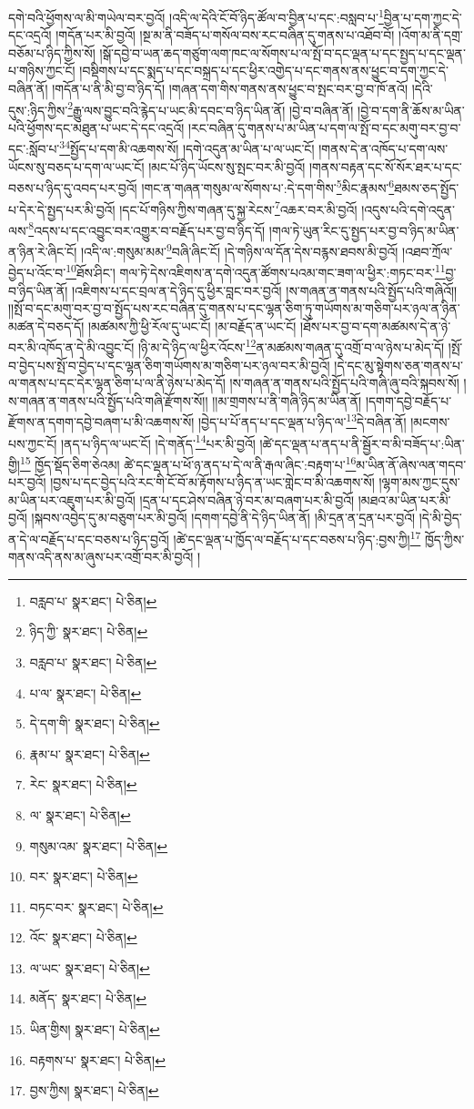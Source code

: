 དགེ་བའི་ཕྱོགས་ལ་མི་གཡེལ་བར་བྱའོ། །འདི་ལ་དེའི་ངོ་བོ་ཉིད་ཚོལ་བ་བྱིན་པ་དང་:བསླབ་པ་\footnote{བརླབ་པ་  སྣར་ཐང་།  པེ་ཅིན། }བྱིན་པ་དག་ཀྱང་དེ་དང་འདྲའོ། །གདོན་པར་མི་བྱའོ། །སྔ་མ་ནི་བཟོད་པ་གསོལ་བས་རང་བཞིན་དུ་གནས་པ་འཐོབ་བོ། །འོག་མ་ནི་དགྲ་བཅོམ་པ་ཉིད་ཀྱིས་སོ། །སྒོ་དབྱེ་བ་ཡན་ཆད་གཙུག་ལག་ཁང་ལ་སོགས་པ་ལ་སྤོ་བ་དང་ལྡན་པ་དང་སྤྱད་པ་དང་ལྡན་པ་གཉིས་ཀྱང་ངོ། །བསྡིགས་པ་དང་སྨད་པ་དང་བསྐྲད་པ་དང་ཕྱིར་འགྱེད་པ་དང་གནས་ནས་ཕྱུང་བ་དག་ཀྱང་དེ་བཞིན་ནོ། །གདོན་པ་ནི་མི་བྱ་བ་ཉིད་དོ། །གཞན་དག་གིས་གནས་ནས་ཕྱུང་བ་སྤང་བར་བྱ་བ་ཁོ་ནའོ། །དེའི་དུས་:ཉིད་ཀྱིས་\footnote{ཉིད་ཀྱི་  སྣར་ཐང་།  པེ་ཅིན། }རྒྱུ་ལས་བྱུང་བའི་རྙེད་པ་ཡང་མི་དབང་བ་ཉིད་ཡིན་ནོ། །བྱེ་བ་བཞིན་ནོ། །བྱེ་བ་དག་ནི་ཆོས་མ་ཡིན་པའི་ཕྱོགས་དང་མཐུན་པ་ཡང་དེ་དང་འདྲའོ། །རང་བཞིན་དུ་གནས་པ་མ་ཡིན་པ་དག་ལ་སྤོ་བ་དང་མགུ་བར་བྱ་བ་དང་:སློབ་པ་\footnote{བརླབ་པ་  སྣར་ཐང་།  པེ་ཅིན། }\footnote{པ་ལ་  སྣར་ཐང་།  པེ་ཅིན། }སྤྱོད་པ་དག་མི་འཆགས་སོ། །དགེ་འདུན་མ་ཡིན་པ་ལ་ཡང་ངོ། །གནས་དེ་ན་འཁོད་པ་དག་ལས་ཡོངས་སུ་བཅད་པ་དག་ལ་ཡང་ངོ། །མང་པོ་ཉིད་ཡོངས་སུ་སྤང་བར་མི་བྱའོ། །གནས་བརྟན་དང་སོ་སོར་ཐར་པ་དང་བཅས་པ་ཉིད་དུ་འབད་པར་བྱའོ། །གང་ན་གཞན་གསུམ་ལ་སོགས་པ་:དེ་དག་གིས་\footnote{དེ་དག་གི་  སྣར་ཐང་།  པེ་ཅིན། }མིང་རྣམས་\footnote{རྣམ་པ་  སྣར་ཐང་།  པེ་ཅིན། }ཐམས་ཅད་སྤྱོད་པ་དེར་དེ་སྤྱད་པར་མི་བྱའོ། །དང་པོ་གཉིས་ཀྱིས་གཞན་དུ་སྐྱ་རེངས་\footnote{རེང་  སྣར་ཐང་།  པེ་ཅིན། }འཆར་བར་མི་བྱའོ། །འདུས་པའི་དགེ་འདུན་ལས་\footnote{ལ་  སྣར་ཐང་།  པེ་ཅིན། }འདས་པ་དང་འབྱུང་བར་འགྱུར་བ་བརྗོད་པར་བྱ་བ་ཉིད་དོ། །གལ་ཏེ་ཡུན་རིང་དུ་སྤྱད་པར་བྱ་བ་ཉིད་མ་ཡིན་ན་ཉིན་རེ་ཞིང་ངོ། །འདི་ལ་:གསུམ་མམ་\footnote{གསུམ་འམ་  སྣར་ཐང་།  པེ་ཅིན། }བཞི་ཞིང་ངོ། །དེ་གཉིས་ལ་དོན་དེས་བརྙས་ཐབས་མི་བྱའོ། །འཐབ་ཀྲོལ་བྱེད་པ་འོང་བ་\footnote{བར་  སྣར་ཐང་།  པེ་ཅིན། }ཐོས་ཤིང་། གལ་ཏེ་དེས་འཇིགས་ན་དགེ་འདུན་ཚོགས་པའམ་གང་ཟག་ལ་ཕྱིར་:གཏང་བར་\footnote{བཏང་བར་  སྣར་ཐང་།  པེ་ཅིན། }བྱ་བ་ཉིད་ཡིན་ནོ། །འཇིགས་པ་དང་བྲལ་ན་དེ་ཉིད་དུ་ཕྱིར་བླང་བར་བྱའོ། །ས་གཞན་ན་གནས་པའི་སྤྱོད་པའི་གཞིའོ།། །།སྤོ་བ་དང་མགུ་བར་བྱ་བ་སྤྱོད་པས་རང་བཞིན་དུ་གནས་པ་དང་ལྷན་ཅིག་ཏུ་གཡོགས་མ་གཅིག་པར་ཉལ་ན་ཉིན་མཚན་དེ་བཅད་དོ། །མཚམས་ཀྱི་ཕྱི་རོལ་དུ་ཡང་ངོ། །མ་བརྗོད་ན་ཡང་ངོ། །ཐོས་པར་བྱ་བ་དག་མཚམས་དེ་ན་ཉེ་བར་མི་འཁོད་ན་དེ་མི་འབྱུང་ངོ། །ཉི་མ་དེ་ཉིད་ལ་ཕྱིར་འོངས་\footnote{འོང་  སྣར་ཐང་།  པེ་ཅིན། }ན་མཚམས་གཞན་དུ་འགྲོ་བ་ལ་ཉེས་པ་མེད་དོ། །སྤོ་བ་བྱེད་པས་སྤོ་བ་བྱེད་པ་དང་ལྷན་ཅིག་གཡོགས་མ་གཅིག་པར་ཉལ་བར་མི་བྱའོ། །དེ་དང་མུ་སྟེགས་ཅན་གནས་པ་ལ་གནས་པ་དང་དེར་ལྷན་ཅིག་པ་ལ་ནི་ཉེས་པ་མེད་དོ། །ས་གཞན་ན་གནས་པའི་སྤྱོད་པའི་གཞི་ཞུ་བའི་སྐབས་སོ། །ས་གཞན་ན་གནས་པའི་སྤྱོད་པའི་གཞི་རྫོགས་སོ།། །།མ་གྲགས་པ་ནི་གཞི་ཉིད་མ་ཡིན་ནོ། །དགག་དབྱེ་བརྗོད་པ་རྫོགས་ན་དགག་དབྱེ་བཞག་པ་མི་འཆགས་སོ། །བྱེད་པ་པོ་ནད་པ་དང་ལྡན་པ་ཉིད་ལ་\footnote{ལ་ཡང་  སྣར་ཐང་།  པེ་ཅིན། }དེ་བཞིན་ནོ། །མངགས་པས་ཀྱང་ངོ། །ནད་པ་ཉིད་ལ་ཡང་ངོ། །དེ་གནོད་\footnote{མནོད་  སྣར་ཐང་།  པེ་ཅིན། }པར་མི་བྱའོ། །ཚེ་དང་ལྡན་པ་ནད་པ་ནི་སྦྱོར་བ་མི་བཟོད་པ་:ཡིན་གྱི།\footnote{ཡིན་གྱིས།  སྣར་ཐང་།  པེ་ཅིན། } ཁྱོད་སྡོད་ཅིག་ཅེའམ། ཚེ་དང་ལྡན་པ་ཕོ་ཉ་ནད་པ་དེ་ལ་ནི་རྒལ་ཞིང་:བརྟག་པ་\footnote{བརྟགས་པ་  སྣར་ཐང་།  པེ་ཅིན། }མ་ཡིན་ནོ་ཞེས་ལན་གདབ་པར་བྱའོ། །བྱས་པ་དང་བྱེད་པའི་རང་གི་ངོ་བོ་མ་རྟོགས་པ་ཉིད་ན་ཡང་གླེང་བ་མི་འཆགས་སོ། །ལྷག་མས་ཀྱང་དུས་མ་ཡིན་པར་འཇུག་པར་མི་བྱའོ། །དྲན་པ་དང་ཤེས་བཞིན་ཉེ་བར་མ་བཞག་པར་མི་བྱའོ། །མཐའ་མ་ཡིན་པར་མི་བྱའོ། །སྐབས་འབྱེད་དུ་མ་བཅུག་པར་མི་བྱའོ། །དགག་དབྱེ་ནི་དེ་ཉིད་ཡིན་ནོ། །མི་དྲན་ན་དྲན་པར་བྱའོ། །དེ་མི་བྱེད་ན་དེ་ལ་བརྗོད་པ་དང་བཅས་པ་ཉིད་བྱའོ། །ཚེ་དང་ལྡན་པ་ཁྱོད་ལ་བརྗོད་པ་དང་བཅས་པ་ཉིད་:བྱས་ཀྱི།\footnote{བྱས་ཀྱིས།  སྣར་ཐང་།  པེ་ཅིན། } ཁྱོད་ཀྱིས་གནས་འདི་ནས་མ་ཞུས་པར་འགྲོ་བར་མི་བྱའོ། །
